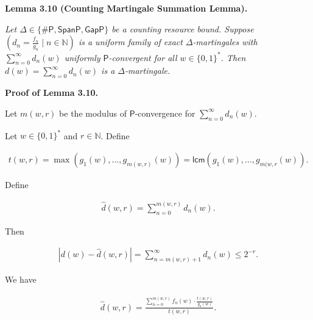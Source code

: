 \par\medskip\noindent\textbf{
\textbf{Lemma 3.10}\textbf{ }(Counting Martingale Summation Lemma)\textbf{.}
}\par



\emph{Let $\Delta\in\{{\mathsf{\#}\mathsf{P}},\mathsf{SpanP},\mathsf{GapP}\}$ be a counting resource bound.
Suppose $\left(d_{n}=\frac{f_{n}}{g_{n}}\mid n\in\mathbb{N}\right)$
is a uniform family of
exact $\Delta$-martingales with $\sum\limits_{n=0}^{\infty}d_{n}(w)$ uniformly
$\mathsf{P}$-convergent for all $w\in\{0,1\}^{*}$.
Then $d(w)=\sum_{n=0}^{\infty}d_{n}(w)$ is a $\Delta$-martingale.}\par







\par\medskip\noindent\textbf{Proof of Lemma 3.10.}\par




Let $m(w,r)$ be the modulus of $\mathsf{P}$-convergence for $\sum_{n=0}^{\infty}d_{n}(w)$.\par




Let $w\in\{0,1\}^{*}$ and $r\in\mathbb{N}$.
Define\par


\[\begin{gathered}
t(w,r)=\max(g_{1}(w),\ldots,g_{m(w,r)}(w))=\mathsf{lcm}(g_{1}(w),\ldots,g_{m(w,r}(w)).
\end{gathered}\]


Define\par


\[\begin{gathered}
\hat{d}(w,r)=\sum_{n=0}^{m(w,r)}d_{n}(w).
\end{gathered}\]


Then\par


\[\begin{gathered}
|d(w)-\hat{d}(w,r)|=\sum_{n=m(w,r)+1}^{\infty}d_{n}(w)\leq 2^{-r}.
\end{gathered}\]


We have\par


\[\begin{gathered}
\hat{d}(w,r)=\frac{\sum\limits_{n=0}^{m(w,r)}f_{n}(w)\cdot\frac{t(w,r)}{g_{n}(w)}}{t(w,r)}.
\end{gathered}\]


